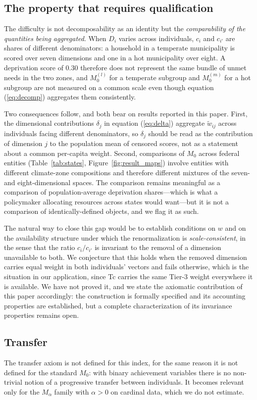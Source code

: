 \documentclass[11pt, a4paper]{article}
\begin{document}
\subsection*{The property that requires qualification}

The difficulty is not decomposability as an identity but the \emph{comparability of the quantities being aggregated}. When $D_i$ varies across individuals, $c_i$ and $c_{i'}$ are shares of different denominators: a household in a temperate municipality is scored over seven dimensions and one in a hot municipality over eight. A deprivation score of $0.30$ therefore does not represent the same bundle of unmet needs in the two zones, and $M_0^{(l)}$ for a temperate subgroup and $M_0^{(m)}$ for a hot subgroup are not measured on a common scale even though equation (\ref{eq:decomp}) aggregates them consistently.

Two consequences follow, and both bear on results reported in this paper. First, the dimensional contributions $\delta_j$ in equation (\ref{eq:delta}) aggregate $\tilde{w}_{ij}$ across individuals facing different denominators, so $\delta_j$ should be read as the contribution of dimension $j$ to the population mean of censored scores, not as a statement about a common per-capita weight. Second, comparisons of $M_0$ across federal entities (Table~\ref{tab:states}, Figure~\ref{fig:result_maps}) involve entities with different climate-zone compositions and therefore different mixtures of the seven- and eight-dimensional spaces. The comparison remains meaningful as a comparison of population-average deprivation shares---which is what a policymaker allocating resources across states would want---but it is not a comparison of identically-defined objects, and we flag it as such.

The natural way to close this gap would be to establish conditions on $w$ and on the availability structure under which the renormalization is \emph{scale-consistent}, in the sense that the ratio $c_i / c_{i'}$ is invariant to the removal of a dimension unavailable to both. We conjecture that this holds when the removed dimension carries equal weight in both individuals' vectors and fails otherwise, which is the situation in our application, since Tc carries the same Tier-3 weight everywhere it is available. We have not proved it, and we state the axiomatic contribution of this paper accordingly: the construction is formally specified and its accounting properties are established, but a complete characterization of its invariance properties remains open.

\subsection*{Transfer}

The transfer axiom is not defined for this index, for the same reason it is not defined for the standard $M_0$: with binary achievement variables there is no non-trivial notion of a progressive transfer between individuals. It becomes relevant only for the $M_\alpha$ family with $\alpha > 0$ on cardinal data, which we do not estimate.

\FloatBarrier

\printbibliography
\end{document}
